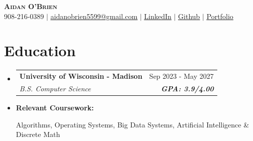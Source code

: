 \documentclass[letterpaper,11pt]{article}
\makeatletter
\newcommand{\resumeSubheading}[4]{
  \vspace{-2pt}\item
    \begin{tabular*}{0.97\textwidth}[t]{l@{\extracolsep{\fill}}r}
      \textbf{#1} & #2 \\
      \textit{\small#3} & \textit{\small #4} \\
    \end{tabular*}\vspace{-7pt}
}
\newcommand{\resumeSubHeadingListStart}{\begin{itemize}[leftmargin=0.15in, label={}]}
\newcommand{\resumeSubHeadingListEnd}{\end{itemize}}
\makeatother
\begin{document}

\begin{center}
    \textbf{\Huge \scshape Aidan O'Brien} \vspace{0.15cm}\\ 
    \small 
    \faPhone \hspace{0.01cm} 908-216-0389 $|$ 
    \faEnvelope \hspace{0.01cm} 
    \href{mailto:aob59922@gmail.com}{\underline{aidanobrien5599@gmail.com}} $|$ 
    \faLinkedin \hspace{0.01cm}
    \href{https://www.linkedin.com/in/aidan-o-brien-393486274/}{\underline{LinkedIn}} $|$
    \faGithub \hspace{0.01cm}
    \href{https://github.com/aidanobrien5599}{\underline{Github}} $|$ 
    \faGlobe \hspace{0.01cm}
    \href{https://aidanpobrien.com}{\underline{Portfolio}} 
    

\end{center}

\section{Education}
  \resumeSubHeadingListStart
    \resumeSubheading
    {University of Wisconsin - Madison}{Sep 2023 - May 2027}
    {B.S. Computer Science}{\textbf{GPA: 3.9/4.00}}
        \resumeSubHeadingListEnd
        
\begin{itemize}[leftmargin=1em, label={}]
    \item \textbf{\footnotesize Relevant Coursework:} \begin{footnotesize}Algorithms, Operating Systems, Big Data Systems, Artificial Intelligence \& Discrete Math  \end{footnotesize}
    
\end{itemize}
\end{document}
